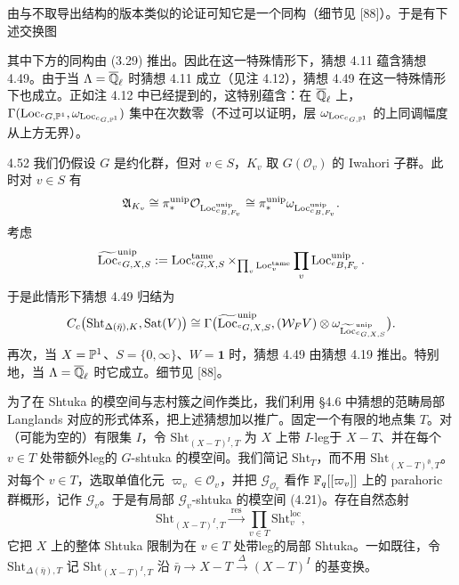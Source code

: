 由与不取导出结构的版本类似的论证可知它是一个同构（细节见 [88]）。于是有下述交换图
\begin{center}
\end{center}
其中下方的同构由 (3.29) 推出。因此在这一特殊情形下，猜想 4.11 蕴含猜想 4.49。由于当 $\Lambda=\overline{\mathbb{Q}}_\ell$ 时猜想 4.11 成立（见注 4.12），猜想 4.49 在这一特殊情形下也成立。正如注 4.12 中已经提到的，这特别蕴含：在 $\overline{\mathbb{Q}}_\ell$ 上，$\Gamma(\operatorname{Loc}_{{}^cG,\mathbb{P}^1},\omega_{\operatorname{Loc}_{{}^cG,\mathbb{P}^1}})$ 集中在次数零（不过可以证明，层 $\omega_{\operatorname{Loc}_{{}^cG,\mathbb{P}^1}}$ 的上同调幅度从上方无界）。

\begin{exam}{4.52}\label{thm:a2-4-52}
我们仍假设 $G$ 是约化群，但对 $v\in S$，$K_v$ 取 $G(\mathcal O_v)$ 的 Iwahori 子群。此时对 $v\in S$ 有
\[
\mathfrak A_{K_v}\cong\pi^{\mathrm{unip}}_*\mathcal O_{\operatorname{Loc}^{\mathrm{unip}}_{{}^cB,F_v}}\cong\pi^{\mathrm{unip}}_*\omega_{\operatorname{Loc}^{\mathrm{unip}}_{{}^cB,F_v}}.
\]
考虑
\[
\widetilde{\operatorname{Loc}}^{\mathrm{unip}}_{{}^cG,X,S}:=\operatorname{Loc}^{\mathrm{tame}}_{{}^cG,X,S}\times_{\prod_v\operatorname{Loc}^{\mathrm{tame}}_v}\prod_v\operatorname{Loc}^{\mathrm{unip}}_{{}^cB,F_v}.
\]
于是此情形下猜想 4.49 归结为
\[
C_c\big(\mathrm{Sht}_{\Delta(\bar\eta),K},\mathrm{Sat}(V)\big)\cong\Gamma\big(\widetilde{\operatorname{Loc}}^{\mathrm{unip}}_{{}^cG,X,S},(\mathcal W_FV)\otimes\omega_{\widetilde{\operatorname{Loc}}^{\mathrm{unip}}_{{}^cG,X,S}}\big).
\]
再次，当 $X=\mathbb{P}^1$、$S=\{0,\infty\}$、$W=\mathbf 1$ 时，猜想 4.49 由猜想 4.19 推出。特别地，当 $\Lambda=\overline{\mathbb{Q}}_\ell$ 时它成立。细节见 [88]。
\end{exam}

为了在 Shtuka 的模空间与志村簇之间作类比，我们利用 §4.6 中猜想的范畴局部 Langlands 对应的形式体系，把上述猜想加以推广。固定一个有限的地点集 $T$。对（可能为空的）有限集 $I$，令 $\mathrm{Sht}_{(X-T)^I,T}$ 为 $X$ 上带 $I$-leg于 $X-T$、并在每个 $v\in T$ 处带额外leg的 $G$-shtuka 的模空间。我们简记 $\mathrm{Sht}_T$，而不用 $\mathrm{Sht}_{(X-T)^\emptyset,T}$。对每个 $v\in T$，选取单值化元 $\varpi_v\in\mathcal O_v$，并把 $\mathcal G_{\mathcal O_v}$ 看作 $\mathbb{F}_q[[\varpi_v]]$ 上的 parahoric 群概形，记作 $\mathcal G_v$。于是有局部 $\mathcal G_v$-shtuka 的模空间 (4.21)。存在自然态射
\[
\mathrm{Sht}_{(X-T)^I,T}\xrightarrow{\ \mathrm{res}\ }\prod_{v\in T}\mathrm{Sht}^{\mathrm{loc}}_v,
\]
它把 $X$ 上的整体 Shtuka 限制为在 $v\in T$ 处带leg的局部 Shtuka。一如既往，令 $\mathrm{Sht}_{\Delta(\bar\eta),T}$ 记 $\mathrm{Sht}_{(X-T)^I,T}$ 沿 $\bar\eta\to X-T\xrightarrow{\Delta}(X-T)^I$ 的基变换。

